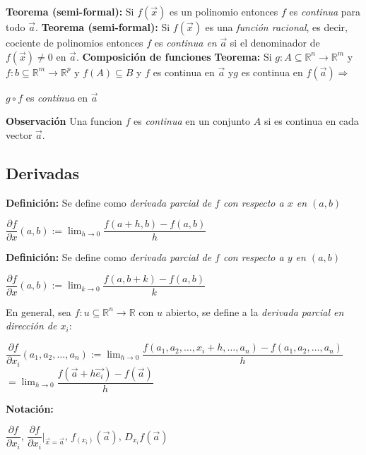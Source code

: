 \documentclass[12pt]{article}
\begin{document}
\noindent\textbf{Teorema (semi-formal):} Si $f(\vec{x})$ es un polinomio entonces $f$ es \emph{continua } para todo $\vec{a}$.\newline
\newline
\noindent\textbf{Teorema (semi-formal):} Si $f(\vec{x})$ es una \emph{función racional}, es decir, cociente de polinomios
entonces $f$ es \emph{continua en} $\vec{a}$ si el denominador de $f(\vec{x})\not=0$ en $\vec{a}$.\newline
\newline
\newpage
\textbf{Composición de funciones}\newline
\textbf{Teorema: }Si $g:A\subseteq\mathbb{R}^n\rightarrow \mathbb{R}^m$ y $f:b\subseteq\mathbb{R}^m\rightarrow \mathbb{R}^p$ y 
$f(A)\subseteq B$ y $f$ es continua en $\vec{a}$ y$g$ es continua en $f(\vec{a})\Longrightarrow$ 
\begin{center}
    $g\circ f$ es \emph{continua} en $\vec{a}$
\end{center}
\noindent \textbf{Observación} Una funcion $f$ es \emph{continua} en un conjunto $A$ si es continua en cada vector $\vec{a}$.
\newpage
\subsection*{Derivadas}
\noindent \textbf{Definición:} Se define como \emph{derivada parcial de $f$ con respecto a $x$ en $(a,b)$}
\begin{center}
    $\dfrac{\partial f}{\partial x}{(a,b)}:=\lim_{h\rightarrow0}{\dfrac{f(a+h,b)-f(a,b)}{h}}$
\end{center}
\noindent \textbf{Definición:} Se define como \emph{derivada parcial de $f$ con respecto a $y$ en $(a,b)$}
\begin{center}
    $\dfrac{\partial f}{\partial x}{(a,b)}:=\lim_{k\rightarrow0}{\dfrac{f(a,b+k)-f(a,b)}{k}}$
\end{center}
\noindent En general, sea $f:u\subseteq\mathbb{R}^n\rightarrow \mathbb{R}$ con $u$ abierto, 
se define a la \emph{derivada parcial en dirección de $x_i$}: 
\begin{center}
    $\dfrac{\partial f}{\partial x_i}{(a_1,a_2,\dots,a_n)}:=\lim_{h\rightarrow0}{\dfrac{f(a_1,a_2,\dots,x_i+h ,\dots,a_n)-f(a_1,a_2,\dots,a_n)}{h}}$
    \indent $=\lim_{h\rightarrow0}{\dfrac{f(\vec{a}+h\vec{e_i})-f(\vec{a})}{h}}$
\end{center}
\noindent \textbf{Notación: }
\begin{center}
    $\dfrac{\partial f}{\partial x_i}$, $\dfrac{\partial f}{\partial x_i}|_{\vec{x}=\vec{a}}$, $f_{(x_i)}(\vec{a})$, $D_{x_i}f(\vec{a})$
\end{center}
\end{document}
